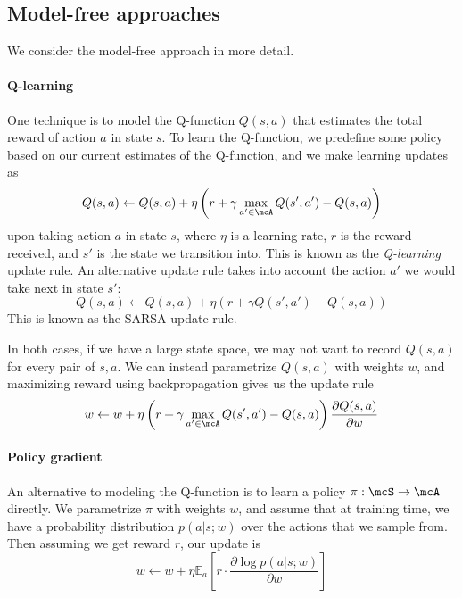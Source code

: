 \documentclass[11pt]{report}
\begin{document}
\subsection{Model-free approaches}

We consider the model-free approach in more detail.

\paragraph{Q-learning} One technique is to model the Q-function $Q(s,a)$ that estimates the total reward of action $a$ in state $s$. To learn the Q-function, we predefine some policy based on our current estimates of the Q-function, and we make learning updates as
\begin{equation}
Q(s,a) \gets Q(s,a) + \eta \left(r + \gamma \max_{a' \in \mcA} Q(s', a') - Q(s,a) \right)
\end{equation}
upon taking action $a$ in state $s$, where $\eta$ is a learning rate, $r$ is the reward received, and $s'$ is the state we transition into. This is known as the \emph{Q-learning} update rule. An alternative update rule takes into account the action $a'$ we would take next in state $s'$:
\begin{equation}
Q(s,a) \gets Q(s,a) + \eta  \left(r + \gamma Q(s', a') - Q(s,a) \right)
\end{equation}
This is known as the SARSA update rule.

In both cases, if we have a large state space, we may not want to record $Q(s,a)$ for every pair of $s,a$. We can instead parametrize $Q(s,a)$ with weights $w$, and maximizing reward using backpropagation gives us the update rule
\begin{equation}
w \gets w + \eta \left(r + \gamma \max_{a' \in \mcA} Q(s', a') - Q(s,a) \right) \frac{\partial Q(s,a)}{\partial w}
\end{equation}

\paragraph{Policy gradient} An alternative to modeling the Q-function is to learn a policy $\pi : \mcS \to \mcA$ directly. We parametrize $\pi$ with weights $w$, and assume that at training time, we have a probability distribution $p(a|s ; w)$ over the actions that we sample from. Then assuming we get reward $r$, our update is
\begin{equation}
w \gets w + \eta \mathbb{E}_a \left[ r \cdot \frac{\partial \log p(a | s ; w)}{\partial w}  \right]
\end{equation}
\end{document}
